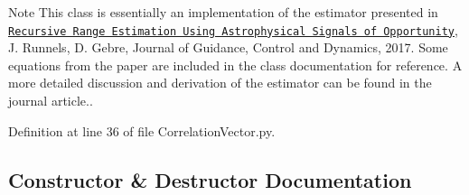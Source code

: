 \begin{DoxyNote}{Note}
This class is essentially an implementation of the estimator presented in \href{https://doi.org/10.2514/1.G002650}{\tt Recursive Range Estimation Using Astrophysical Signals of Opportunity}, J. Runnels, D. Gebre, Journal of Guidance, Control and Dynamics, 2017. Some equations from the paper are included in the class documentation for reference. A more detailed discussion and derivation of the estimator can be found in the journal article.. 
\end{DoxyNote}


Definition at line 36 of file Correlation\+Vector.\+py.



\subsection{Constructor \& Destructor Documentation}
